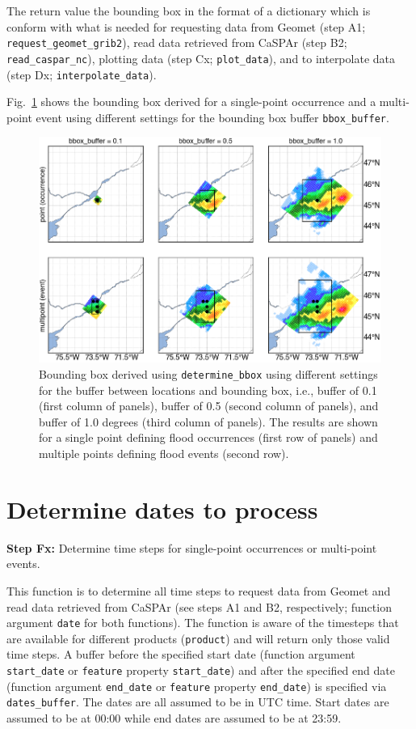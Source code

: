 \documentclass[10pt,a4paper,titlepage,parskip]{scrartcl}
\begin{document}
\vspace*{-0.3cm}
The return value the bounding box in the format of a dictionary which is conform with what is needed for requesting data from Geomet (step A1; \texttt{request\_geomet\_grib2}), read data retrieved from CaSPAr (step B2; \texttt{read\_caspar\_nc}), plotting data (step Cx; \texttt{plot\_data}), and to interpolate data (step Dx; \texttt{interpolate\_data}). 

Fig.~\ref{fig:plot_example:bounding_box} shows the bounding box derived for a single-point occurrence and a multi-point event using different settings for the bounding box buffer \texttt{bbox\_buffer}.

\begin{figure}
	\centering
	\includegraphics[width=0.7\linewidth]{figures/test-bounding-box.png}
	\caption{Bounding box derived using \texttt{determine\_bbox} using different settings for the buffer between locations and bounding box, i.e., buffer of 0.1 (first column of panels), buffer of 0.5 (second column of panels), and buffer of 1.0 degrees (third column of panels). The results are shown for a single point defining flood occurrences (first row of panels) and multiple points defining flood events (second row).}
	\label{fig:plot_example:bounding_box}
\end{figure}
\clearpage

\section{Determine dates to process}

\textbf{Step Fx:} Determine time steps for single-point occurrences or multi-point events.

This function is to determine all time steps to request data from Geomet and read data retrieved from CaSPAr (see steps A1 and B2, respectively; function argument \texttt{date} for both functions). The function is aware of the timesteps that are available for different products (\texttt{product}) and will return only those valid time steps. A buffer before the specified start date (function argument \texttt{start\_date} or \texttt{feature} property \texttt{start\_date}) and after the specified end date (function argument \texttt{end\_date} or \texttt{feature} property \texttt{end\_date}) is specified via \texttt{dates\_buffer}. The dates are all assumed to be in UTC time. Start dates are assumed to be at 00:00 while end dates are assumed to be at 23:59.
\end{document}
